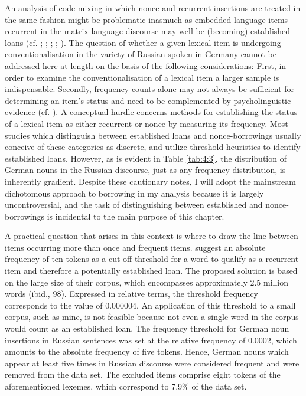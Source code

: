 An analysis of code-mixing in which nonce and recurrent insertions are treated in the same fashion might be problematic inasmuch as embedded-language items recurrent in the matrix language discourse may well be (becoming) established loans (cf. \citealt{backus-13}; \citealt{myers-scotton-duelling-1993};  \citealt{poplack-etal-1988}; \citealt{poplack-dion-2012}; \citealt{poplack18}). The question of whether a given lexical item is undergoing conventionalisation in the variety of Russian spoken in Germany cannot be addressed here at length on the basis of the following considerations: First, in order to examine the conventionalisation of a lexical item a larger sample is indispensable. Secondly, frequency counts alone may not always be sufficient for determining an item's status and need to be complemented by psycholinguistic evidence (cf. \citealt{blumenthal}). A conceptual hurdle concerns methods for establishing the status of a lexical item as either recurrent or nonce by measuring its frequency. Most studies which distinguish between established loans and nonce-borrowings usually conceive of these categories as discrete, and utilize threshold heuristics to identify established loans. However, as is evident in Table \ref{tab:4:3}, the distribution of German nouns in the Russian discourse, just as any frequency distribution, is inherently gradient. Despite these cautionary notes, I will adopt the mainstream dichotomous approach to borrowing in my analysis because it is largely uncontroversial, and the task of distinguishing between established and nonce-borrowings is incidental to the main purpose of this chapter. 

A practical question that arises in this context is where to draw the line between items occurring more than once and frequent items. \citet{poplack-etal-1988} suggest an absolute frequency of ten tokens as a cut-off threshold for a word to qualify as a recurrent item and therefore a potentially established loan. The proposed solution is based on the large size of their corpus, which encompasses approximately 2.5 million words (ibid., 98). Expressed in relative terms, the threshold frequency corresponds to the value of 0.000004. An application of this threshold to a small corpus, such as mine, is not feasible because not even a single word in the corpus would count as an established loan. The frequency threshold for German noun insertions in Russian sentences was set at the relative frequency of 0.0002, which amounts to the absolute frequency of five tokens. Hence, German nouns which appear at least five times in Russian discourse were considered frequent and were removed from the data set. The excluded items comprise eight tokens of the aforementioned lexemes, which correspond to 7.9\% of the data set.

